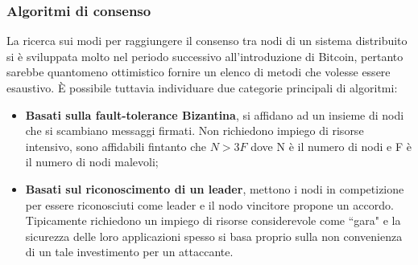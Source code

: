 		\subsubsection{Algoritmi di consenso}
			La ricerca sui modi per raggiungere il consenso tra nodi di un sistema distribuito si è sviluppata molto nel periodo successivo all'introduzione di Bitcoin, pertanto sarebbe quantomeno ottimistico fornire un elenco di metodi che volesse essere esaustivo. È possibile tuttavia individuare due categorie principali di algoritmi:
			\begin{itemize}
				\item \textbf{Basati sulla fault-tolerance Bizantina}, si affidano ad un insieme di nodi che si scambiano messaggi firmati. Non richiedono impiego di risorse intensivo, sono affidabili fintanto che $N > 3F$ dove N è il numero di nodi e F è il numero di nodi malevoli;
				\item \textbf{Basati sul riconoscimento di un leader}, mettono i nodi in competizione per essere riconosciuti come leader e il nodo vincitore propone un accordo. Tipicamente richiedono un impiego di risorse considerevole come ``gara" e la sicurezza delle loro applicazioni spesso si basa proprio sulla non convenienza di un tale investimento per un attaccante.
			\end{itemize}


